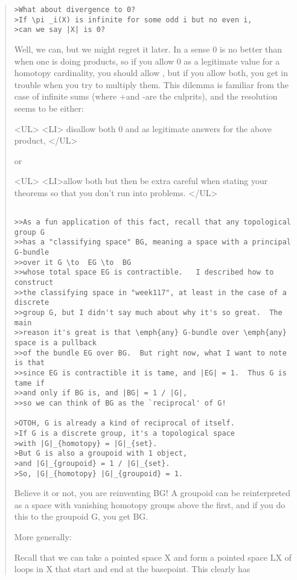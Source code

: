 \begin{quote}
\begin{verbatim}
>What about divergence to 0?
>If \pi _i(X) is infinite for some odd i but no even i,
>can we say |X| is 0?
\end{verbatim}
    

Well, we can, but we might regret it later.  In a sense 0 is no
better than \infty  when one is doing products, so if you allow 
0 as a legitimate value for a homotopy cardinality, you should 
allow \infty , but if you allow both, you get in trouble when 
you try to multiply them.  This dilemma is familiar from the case 
of infinite sums (where +\infty  and -\infty  are the culprits), 
and the resolution seems to be either:

<UL>
<LI> disallow both 0 and \infty  as legitimate answers for the above
product,
</UL>

or

<UL>
<LI>allow both but then be extra careful when stating your theorems
so that you don't run into problems.  
</UL>


\begin{verbatim}

>>As a fun application of this fact, recall that any topological group G
>>has a "classifying space" BG, meaning a space with a principal G-bundle 
>>over it G \to  EG \to  BG
>>whose total space EG is contractible.   I described how to construct
>>the classifying space in "week117", at least in the case of a discrete
>>group G, but I didn't say much about why it's so great.  The main 
>>reason it's great is that \emph{any} G-bundle over \emph{any} space is a pullback 
>>of the bundle EG over BG.  But right now, what I want to note is that 
>>since EG is contractible it is tame, and |EG| = 1.  Thus G is tame if 
>>and only if BG is, and |BG| = 1 / |G|,
>>so we can think of BG as the `reciprocal' of G!

>OTOH, G is already a kind of reciprocal of itself.
>If G is a discrete group, it's a topological space
>with |G|_{homotopy} = |G|_{set}.
>But G is also a groupoid with 1 object,
>and |G|_{groupoid} = 1 / |G|_{set}.
>So, |G|_{homotopy} |G|_{groupoid} = 1.
\end{verbatim}
    

Believe it or not, you are reinventing BG!   A groupoid can be
reinterpreted as a space with vanishing homotopy groups above the
first, and if you do this to the groupoid G, you get BG.  

More generally:

Recall that we can take a pointed space X and form a pointed space
LX of loops in X that start and end at the basepoint.  This clearly 
has


\end{quote}
